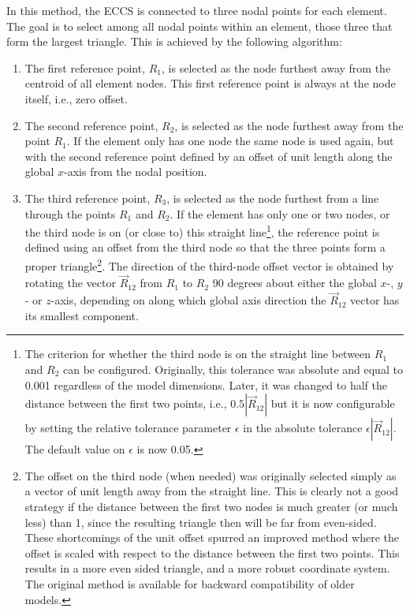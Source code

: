 In this method, the ECCS is connected to three nodal points for each element.
The goal is to select among all nodal points within an element,
those three that form the largest triangle.
This is achieved by the following algorithm:
%
\begin{enumerate}
\item The first reference point, $R_1$,
is selected as the node furthest away from the centroid of all element nodes.
This first reference point is always at the node itself, i.e., zero offset.
%
\item The second reference point, $R_2$,
is selected as the node furthest away from the point $R_1$.
If the element only has one node the same node is used again,
but with the second reference point defined by an offset of unit length
along the global $x$-axis from the nodal position.
%
\item The third reference point, $R_3$,
is selected as the node furthest from a line through the points $R_1$ and $R_2$.
If the element has only one or two nodes, or the third node is on (or close to)
this straight line\footnote{The criterion for whether the third node is on the
straight line between $R_1$ and $R_2$ can be configured.
Originally, this tolerance was absolute and equal to 0.001 regardless of the
model dimensions. Later, it was changed to half the distance between the first
two points, i.e., $0.5|\vec{R}_{12}|$ but it is now configurable by setting
the relative tolerance parameter $\epsilon$ in the absolute tolerance
$\epsilon|\vec{R}_{12}|$. The default value on $\epsilon$ is now 0.05.},
the reference point is defined using an offset from the
third node so that the three points form a proper triangle\footnote{
The offset on the third node (when needed) was originally selected
simply as a vector of unit length away from the straight line.
This is clearly not a good strategy if the distance between the first two nodes
is much greater (or much less) than 1,
since the resulting triangle then will be far from even-sided.
These shortcomings of the unit offset spurred an improved method where the
offset is scaled with respect to the distance between the first two points.
This results in a more even sided triangle, and a more robust coordinate system.
The original method is available for backward compatibility of older models.}.
The direction of the third-node offset vector is obtained by rotating the vector
$\vec{R}_{12}$ from $R_1$ to $R_2$ 90 degrees about either the global $x$-, $y$-
or $z$-axis, depending on along which global axis direction the $\vec{R}_{12}$
vector has its smallest component.

\end{enumerate}
